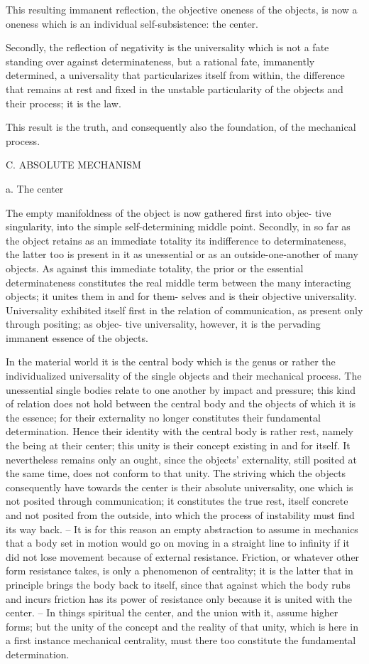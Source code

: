 This resulting immanent reflection,
the objective oneness of the objects,
is now a oneness which is an individual self-subsistence:
the center.

Secondly, the reflection of negativity is
the universality which is not a fate standing over against determinateness,
but a rational fate, immanently determined,
a universality that particularizes itself from within,
the difference that remains at rest and fixed
in the unstable particularity of the objects
and their process;
it is the law.

This result is the truth,
and consequently also the foundation,
of the mechanical process.

C. ABSOLUTE MECHANISM

a. The center

The empty manifoldness of the object is now gathered first into objec-
tive singularity, into the simple self-determining middle point. Secondly,
in so far as the object retains as an immediate totality its indifference
to determinateness, the latter too is present in it as unessential or as an
outside-one-another of many objects. As against this immediate totality,
the prior or the essential determinateness constitutes the real middle term
between the many interacting objects; it unites them in and for them-
selves and is their objective universality. Universality exhibited itself first in
the relation of communication, as present only through positing; as objec-
tive universality, however, it is the pervading immanent essence of the
objects.

In the material world it is the central body which is the genus or rather
the individualized universality of the single objects and their mechanical
process. The unessential single bodies relate to one another by impact
and pressure; this kind of relation does not hold between the central body
and the objects of which it is the essence; for their externality no longer
constitutes their fundamental determination. Hence their identity with the
central body is rather rest, namely the being at their center; this unity is their
concept existing in and for itself. It nevertheless remains only an ought, since
the objects' externality, still posited at the same time, does not conform
to that unity. The striving which the objects consequently have towards
the center is their absolute universality, one which is not posited through
communication; it constitutes the true rest, itself concrete and not posited from
the outside, into which the process of instability must find its way back. – It
is for this reason an empty abstraction to assume in mechanics that a body
set in motion would go on moving in a straight line to infinity if it did not
lose movement because of external resistance. Friction, or whatever other
form resistance takes, is only a phenomenon of centrality; it is the latter
that in principle brings the body back to itself, since that against which
the body rubs and incurs friction has its power of resistance only because
it is united with the center. – In things spiritual the center, and the union
with it, assume higher forms; but the unity of the concept and the reality
of that unity, which is here in a first instance mechanical centrality, must
there too constitute the fundamental determination.

